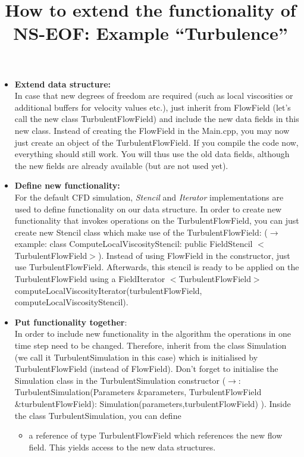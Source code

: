 \documentclass[pdftex,A4]{article}
\begin{document}
\title{How to extend the functionality of NS-EOF: Example ``Turbulence''}
\maketitle

\begin{itemize}
\item {\bf Extend data structure:}\\
In case that new degrees of freedom are required (such as local viscosities or additional buffers for velocity values etc.),
just inherit from FlowField (let's call the new class TurbulentFlowField) and include the new data fields in this new class.
Instead of creating the FlowField in the Main.cpp, you may now just create an object of the TurbulentFlowField.
If you compile the code now, everything should still work.
You will thus use the old data fields, although the new fields are already available (but are not used yet).
\item {\bf Define new functionality:}\\
For the default CFD simulation, {\it Stencil} and {\it Iterator} implementations are used to define functionality on our data structure.
In order to create new functionality that invokes operations on the TurbulentFlowField,
you can just create new Stencil class which make use of the TurbulentFlowField:
($\rightarrow$ example: class ComputeLocalViscosityStencil: public Field\-Stencil $<$TurbulentFlowField$>$).
Instead of using FlowField in the constructor, just use TurbulentFlowField.
Afterwards, this stencil is ready to be applied on the TurbulentFlowField using a FieldIterator
$<$Turbulent\-Flow\-Field$>$ compute\-Local\-Viscosity\-Iterator(turbulent\-Flow\-Field, compute\-Local\-Viscosity\-Stencil).
\item {\bf Put functionality together}:\\
In order to include new functionality in the algorithm the operations in one time step need to be changed.
Therefore, inherit from the class Simulation (we call it TurbulentSimulation in this case) which is initialised by TurbulentFlowField (instead of FlowField).
Don't forget to initialise the Simulation class in the TurbulentSimulation constructor
($\rightarrow$: TurbulentSimulation(Parameters \&parameters, TurbulentFlowField \&turbulentFlowField): Simulation(parameters,turbulentFlowField) ). Inside the class TurbulentSimulation, you can define
  \begin{itemize}
  \item a reference of type TurbulentFlowField which references the new flow field. This yields access to the new data structures.

\end{itemize}
\end{itemize}
\end{document}
